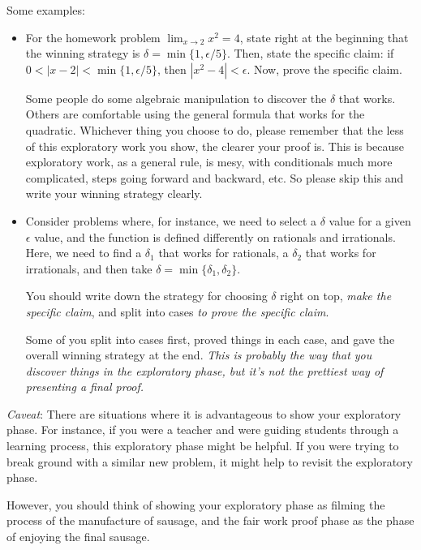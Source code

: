 \documentclass{amsart}
\begin{document}
Some examples:

\begin{itemize}
\item For the homework problem $\lim_{x \to 2} x^2 = 4$, state right
  at the beginning that the winning strategy is $\delta = \min \{1,
  \epsilon/5\}$. Then, state the specific claim: if $0 < |x - 2| <
  \min \{ 1, \epsilon/5 \}$, then $|x^2 - 4| < \epsilon$. Now, prove
  the specific claim.

  Some people do some algebraic manipulation to discover the $\delta$
  that works. Others are comfortable using the general formula that
  works for the quadratic. Whichever thing you choose to do, please
  remember that the less of this exploratory work you show, the
  clearer your proof is. This is because exploratory work, as a
  general rule, is mesy, with conditionals much more complicated,
  steps going forward and backward, etc. So please skip this and write
  your winning strategy clearly.

\item Consider problems where, for instance, we need to select a
  $\delta$ value for a given $\epsilon$ value, and the function is
  defined differently on rationals and irrationals. Here, we need to
  find a $\delta_1$ that works for rationals, a $\delta_2$ that works
  for irrationals, and then take $\delta = \min \{ \delta_1,
  \delta_2\}$.

  You should write down the strategy for choosing $\delta$ right on
  top, {\em make the specific claim}, and split into cases {\em to
  prove the specific claim}.

  Some of you split into cases first, proved things in each case, and
  gave the overall winning strategy at the end. {\em This is probably
  the way that you discover things in the exploratory phase, but it's
  not the prettiest way of presenting a final proof.}

\end{itemize}

{\em Caveat}: There are situations where it is advantageous to show
your exploratory phase. For instance, if you were a teacher and were
guiding students through a learning process, this exploratory phase
might be helpful. If you were trying to break ground with a similar
new problem, it might help to revisit the exploratory phase.

However, you should think of showing your exploratory phase as filming
the process of the manufacture of sausage, and the fair work proof
phase as the phase of enjoying the final sausage.
\end{document}

